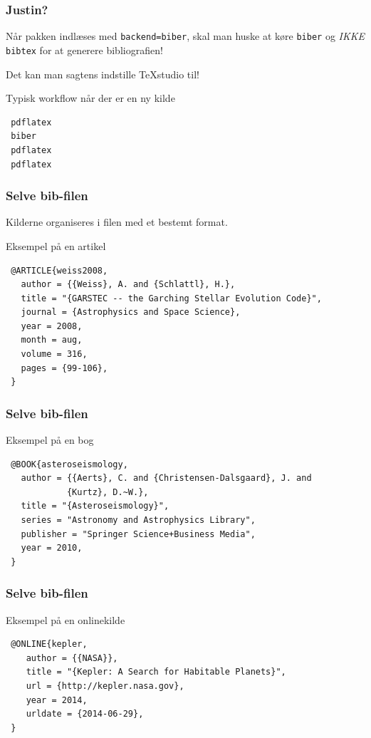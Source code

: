 \documentclass{beamer}
\newcommand{\plainbreak}[1]{\vspace{#1\baselineskip}}
\begin{document}
\begin{frame}[fragile]
  \frametitle{Justin?}

  Når pakken indlæses med \texttt{backend=biber}, skal man huske at køre
  \texttt{biber} og \emph{IKKE} \texttt{bibtex} for at generere bibliografien!

  Det kan man sagtens indstille \alert{TeXstudio} til!

  \plainbreak1

  \begin{block}{Typisk workflow når der er en ny kilde}
\begin{verbatim}
 pdflatex
 biber
 pdflatex
 pdflatex
\end{verbatim}
  \end{block}
\end{frame}


\begin{frame}[fragile]
  \frametitle{Selve bib-filen}

  Kilderne organiseres i filen med et bestemt format.

  \plainbreak1

  \begin{exampleblock}{Eksempel på en artikel}
    \fontsize{8pt}{10pt}\selectfont
\begin{verbatim}
 @ARTICLE{weiss2008,
   author = {{Weiss}, A. and {Schlattl}, H.},
   title = "{GARSTEC -- the Garching Stellar Evolution Code}",
   journal = {Astrophysics and Space Science},
   year = 2008,
   month = aug,
   volume = 316,
   pages = {99-106},
 }
\end{verbatim}
  \end{exampleblock}
\end{frame}


\begin{frame}[fragile]
  \frametitle{Selve bib-filen}

  \begin{exampleblock}{Eksempel på en bog}
    \fontsize{8pt}{10pt}\selectfont
\begin{verbatim}
 @BOOK{asteroseismology,
   author = {{Aerts}, C. and {Christensen-Dalsgaard}, J. and
            {Kurtz}, D.~W.},
   title = "{Asteroseismology}",
   series = "Astronomy and Astrophysics Library",
   publisher = "Springer Science+Business Media",
   year = 2010,
 }
\end{verbatim}
  \end{exampleblock}
\end{frame}


\begin{frame}[fragile]
  \frametitle{Selve bib-filen}

  \begin{exampleblock}{Eksempel på en onlinekilde}
    \fontsize{8pt}{10pt}\selectfont
\begin{verbatim}
 @ONLINE{kepler,
    author = {{NASA}},
    title = "{Kepler: A Search for Habitable Planets}",
    url = {http://kepler.nasa.gov},
    year = 2014,
    urldate = {2014-06-29},
 }
\end{verbatim}
  \end{exampleblock}
\end{frame}
\end{document}
